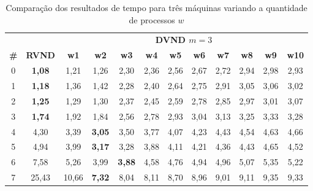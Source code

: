 \begin{table}[htbp]
\caption{Comparação dos resultados de tempo para três máquinas variando a quantidade de processos $w$}
\begin{center}
\begin{tabular}{cccccccccccc}
\hline
\hline
\multicolumn{2}{c}{} &\multicolumn{10}{c}{\textbf{DVND $m=3$}} \\
\cline{3-12}
\textbf{\#} & \textbf{RVND}& \textbf{w1}& \textbf{w2}& \textbf{w3}& \textbf{w4}& \textbf{w5}& \textbf{w6}& \textbf{w7}& \textbf{w8}& \textbf{w9}& \textbf{w10} \\
\hline
0 & \textbf{1,08}& 1,21&1,26&2,30&2,36&2,56&2,67&2,72&2,94&2,98&2,93 \\
1 & \textbf{1,18}& 1,36&1,42&2,28&2,40&2,64&2,75&2,91&3,05&3,06&3,02 \\
2 & \textbf{1,25}& 1,29&1,30&2,37&2,45&2,59&2,78&2,85&2,97&3,01&3,07 \\
3 & \textbf{1,74}& 1,92&1,84&2,56&2,78&2,93&3,04&3,13&3,25&3,33&3,28 \\
4 & 4,30& 3,39&\textbf{3,05}&3,50&3,77&4,07&4,23&4,43&4,54&4,63&4,66 \\
5 & 4,94& 3,99&\textbf{3,17}&3,28&3,88&4,11&4,21&4,36&4,43&4,65&4,52 \\
6 & 7,58& 5,26&3,99&\textbf{3,88}&4,58&4,76&4,94&4,96&5,07&5,35&5,22 \\
7 &25,43&10,66&\textbf{7,32}&8,04&8,11&8,70&8,96&9,01&9,11&9,35&9,33 \\
\hline
\end{tabular}
\label{tab:rvndDvndN3times}
\end{center}
\end{table}

